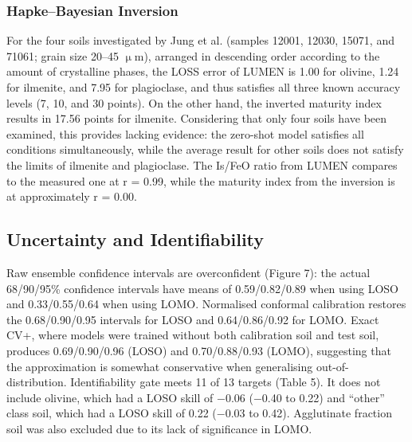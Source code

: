 \documentclass[remotesensing,article,submit,pdftex,moreauthors]{Definitions/mdpi}
\begin{document}
\subsubsection{Hapke--Bayesian Inversion~\cite{jung2026}}

For the four soils investigated by Jung et al. (samples 12001, 12030, 15071, and 71061; grain size 20--45 $\upmu$m), arranged in descending order according to the amount of crystalline phases, the LOSS error of LUMEN is 1.00 for olivine, 1.24 for ilmenite, and 7.95 for plagioclase, and thus satisfies all three known accuracy levels (7, 10, and 30 points). On the other hand, the inverted maturity index results in 17.56 points for ilmenite. Considering that only four soils have been examined, this provides lacking evidence: the zero-shot model satisfies all conditions simultaneously, while the average result for other soils does not satisfy the limits of ilmenite and plagioclase. The Is/FeO ratio from LUMEN compares to the measured one at r = 0.99, while the maturity index from the inversion is at approximately r = 0.00.

\subsection{Uncertainty and Identifiability}

Raw ensemble confidence intervals are overconfident (Figure 7): the actual 68/90/95\% confidence intervals have means of 0.59/0.82/0.89 when using LOSO and 0.33/0.55/0.64 when using LOMO. Normalised conformal calibration restores the 0.68/0.90/0.95 intervals for LOSO and 0.64/0.86/0.92 for LOMO. Exact CV+, where models were trained without both calibration soil and test soil, produces 0.69/0.90/0.96 (LOSO) and 0.70/0.88/0.93 (LOMO), suggesting that the approximation is somewhat conservative when generalising out-of-distribution. Identifiability gate meets 11 of 13 targets (Table 5). It does not include olivine, which had a LOSO skill of $-$0.06 ($-$0.40 to 0.22) and ``other'' class soil, which had a LOSO skill of 0.22 ($-$0.03 to 0.42). Agglutinate fraction soil was also excluded due to its lack of significance in LOMO.
\end{document}
